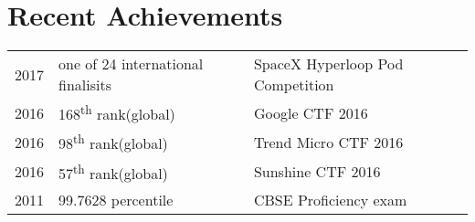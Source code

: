 \documentclass[]{illustris-resume-openfont}
\begin{document}
\begin{minipage}[t]{0.66\textwidth}



\section{Recent Achievements} 
\begin{tabular}{rll}

2017    & one of 24 international finalisits    & SpaceX Hyperloop Pod Competition \\
2016    & 168\textsuperscript{th} rank(global)    & Google CTF 2016 \\
2016    & 98\textsuperscript{th} rank(global) & Trend Micro CTF 2016 \\
2016    & 57\textsuperscript{th} rank(global) & Sunshine CTF 2016 \\
2011    & 99.7628 percentile  & CBSE Proficiency exam \\

\end{tabular}



\end{minipage}
\end{document}
